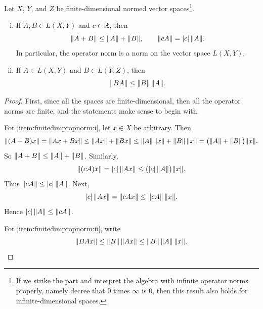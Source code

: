 \begin{prop} \label{prop:finitedimpropnorm}
\pagebreak[3]
Let $X$, $Y$, and $Z$ be finite-dimensional normed vector
spaces\footnote{If we strike the  part and interpret the
algebra with infinite operator norms properly, namely decree that $0$ times
$\infty$ is 0, then this result also holds for infinite-dimensional spaces.}.
\begin{enumerate}[(i)]
\item \label{item:finitedimpropnorm:i}
If $A,B \in L(X,Y)$ and $c \in {\mathbb{R}}$, then
\begin{equation*}
\lVert {A+B} \rVert \leq \lVert {A} \rVert+\lVert {B} \rVert, \qquad \lVert {cA} \rVert = \lvert {c} \rvert \, \lVert {A} \rVert .
\end{equation*}
In particular, the operator norm is a norm on the vector space $L(X,Y)$.
\item \label{item:finitedimpropnorm:ii}
If $A \in L(X,Y)$ and $B \in L(Y,Z)$, then
\begin{equation*}
\lVert {BA} \rVert \leq \lVert {B} \rVert \, \lVert {A} \rVert .
\end{equation*}
\end{enumerate}
\end{prop}

\begin{proof}
First, since all the spaces are finite-dimensional, then all the operator
norms are finite, and the statements make sense to begin with.

For \ref{item:finitedimpropnorm:i}, let $x \in X$ be arbitrary.  Then
\begin{equation*}
\lVert {(A+B)x} \rVert =
\lVert {Ax+Bx} \rVert \leq
\lVert {Ax} \rVert+\lVert {Bx} \rVert \leq
\lVert {A} \rVert \, \lVert {x} \rVert+\lVert {B} \rVert \,\lVert {x} \rVert =
\bigl(\lVert {A} \rVert+\lVert {B} \rVert\bigr) \lVert {x} \rVert .
\end{equation*}
So $\lVert {A+B} \rVert \leq \lVert {A} \rVert+\lVert {B} \rVert$.
Similarly,
\begin{equation*}
\lVert {(cA)x} \rVert =
\lvert {c} \rvert \, \lVert {Ax} \rVert \leq \bigl(\lvert {c} \rvert \,\lVert {A} \rVert\bigr) \lVert {x} \rVert .
\end{equation*}
Thus $\lVert {cA} \rVert \leq \lvert {c} \rvert \, \lVert {A} \rVert$.  Next,
\begin{equation*}
\lvert {c} \rvert \,  \lVert {Ax} \rVert
=
\lVert {cAx} \rVert \leq \lVert {cA} \rVert \, \lVert {x} \rVert .
\end{equation*}
Hence $\lvert {c} \rvert \, \lVert {A} \rVert \leq \lVert {cA} \rVert$.


For \ref{item:finitedimpropnorm:ii}, write
\begin{equation*}
\lVert {BAx} \rVert \leq \lVert {B} \rVert \, \lVert {Ax} \rVert \leq \lVert {B} \rVert \, \lVert {A} \rVert \, \lVert {x} \rVert .
\qedhere
\end{equation*}
\end{proof}

